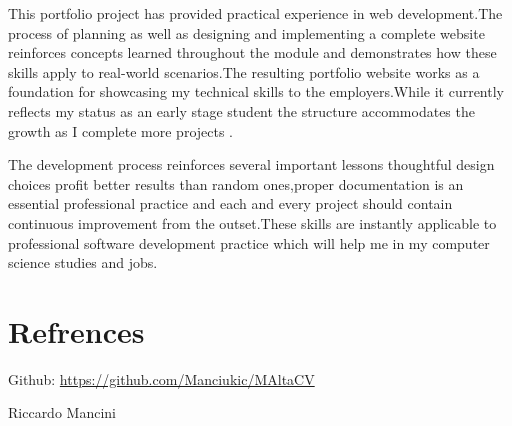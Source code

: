 \documentclass[12pt,a4paper]{article}
\begin{document}
This portfolio project has provided practical experience in web development.The process of planning as well as designing and implementing a complete website reinforces concepts learned throughout the module and demonstrates how these skills apply to real-world scenarios.The resulting portfolio website works as a foundation for showcasing my technical skills to the employers.While it currently reflects my status as an early stage student the structure accommodates the growth as I complete more projects .

The development process reinforces several important lessons thoughtful design choices profit better results than random ones,proper documentation is an essential professional practice and each and every project should contain continuous improvement from the outset.These skills are instantly applicable to professional software development practice which will help me in my computer science studies and jobs.

\section{Refrences}

Github: \url{https://github.com/Manciukic/MAltaCV}

Riccardo Mancini
\end{document}
